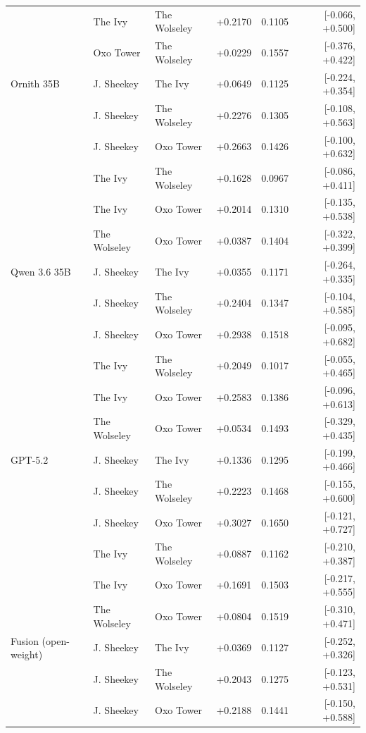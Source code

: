 \begin{table}[htbp]
\begin{tabular}{lllrrr}
   & The Ivy & The Wolseley & +0.2170 & 0.1105 & [-0.066, +0.500] \\
   & Oxo Tower & The Wolseley & +0.0229 & 0.1557 & [-0.376, +0.422] \\
\addlinespace
  Ornith 35B & J. Sheekey & The Ivy & +0.0649 & 0.1125 & [-0.224, +0.354] \\
   & J. Sheekey & The Wolseley & +0.2276 & 0.1305 & [-0.108, +0.563] \\
   & J. Sheekey & Oxo Tower & +0.2663 & 0.1426 & [-0.100, +0.632] \\
   & The Ivy & The Wolseley & +0.1628 & 0.0967 & [-0.086, +0.411] \\
   & The Ivy & Oxo Tower & +0.2014 & 0.1310 & [-0.135, +0.538] \\
   & The Wolseley & Oxo Tower & +0.0387 & 0.1404 & [-0.322, +0.399] \\
\addlinespace
  Qwen 3.6 35B & J. Sheekey & The Ivy & +0.0355 & 0.1171 & [-0.264, +0.335] \\
   & J. Sheekey & The Wolseley & +0.2404 & 0.1347 & [-0.104, +0.585] \\
   & J. Sheekey & Oxo Tower & +0.2938 & 0.1518 & [-0.095, +0.682] \\
   & The Ivy & The Wolseley & +0.2049 & 0.1017 & [-0.055, +0.465] \\
   & The Ivy & Oxo Tower & +0.2583 & 0.1386 & [-0.096, +0.613] \\
   & The Wolseley & Oxo Tower & +0.0534 & 0.1493 & [-0.329, +0.435] \\
\addlinespace
  GPT-5.2 & J. Sheekey & The Ivy & +0.1336 & 0.1295 & [-0.199, +0.466] \\
   & J. Sheekey & The Wolseley & +0.2223 & 0.1468 & [-0.155, +0.600] \\
   & J. Sheekey & Oxo Tower & +0.3027 & 0.1650 & [-0.121, +0.727] \\
   & The Ivy & The Wolseley & +0.0887 & 0.1162 & [-0.210, +0.387] \\
   & The Ivy & Oxo Tower & +0.1691 & 0.1503 & [-0.217, +0.555] \\
   & The Wolseley & Oxo Tower & +0.0804 & 0.1519 & [-0.310, +0.471] \\
\addlinespace
  Fusion (open-weight) & J. Sheekey & The Ivy & +0.0369 & 0.1127 & [-0.252, +0.326] \\
   & J. Sheekey & The Wolseley & +0.2043 & 0.1275 & [-0.123, +0.531] \\
   & J. Sheekey & Oxo Tower & +0.2188 & 0.1441 & [-0.150, +0.588] \\

\end{tabular}
\end{table}

